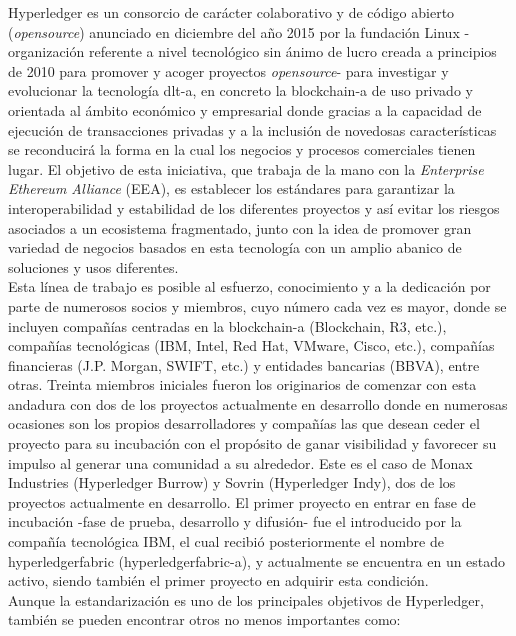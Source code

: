 \documentclass[12pt,a4paper, twoside]{report}
\begin{document}
	Hyperledger es un consorcio de carácter colaborativo y de código abierto (\textit{\gls{opensource}}) anunciado en diciembre del año 2015 por la fundación Linux -organización referente a nivel tecnológico sin ánimo de lucro creada a principios de 2010 para promover y acoger proyectos \textit{\gls{opensource}}- para investigar y evolucionar la tecnología \gls{dlt-a}, en concreto la \gls{blockchain-a} de uso privado y orientada al ámbito económico y empresarial donde gracias a la capacidad de ejecución de transacciones privadas y a la inclusión de novedosas características se reconducirá la forma en la cual los negocios y procesos comerciales tienen lugar. El objetivo de esta iniciativa, que trabaja de la mano con la \textit{Enterprise Ethereum Alliance} (EEA), es establecer los estándares para garantizar la interoperabilidad y estabilidad de los diferentes proyectos y así evitar  los riesgos asociados a un ecosistema fragmentado, junto con la idea de promover gran variedad de negocios basados en esta tecnología con un amplio abanico de soluciones y usos diferentes. \\
	 		
	Esta línea de trabajo es posible al esfuerzo, conocimiento y a la dedicación por parte de numerosos socios y miembros, cuyo número cada vez es mayor, donde se incluyen compañías centradas en la \gls{blockchain-a} (Blockchain, R3, etc.), compañías tecnológicas (IBM, Intel, Red Hat, VMware, Cisco, etc.), compañías financieras (J.P. Morgan, SWIFT, etc.) y entidades bancarias (BBVA), entre otras. Treinta miembros iniciales fueron los originarios de comenzar con esta andadura con dos de los proyectos actualmente en desarrollo donde en numerosas ocasiones son los propios desarrolladores y compañías las que desean ceder el proyecto para su incubación con el propósito de ganar visibilidad y favorecer su impulso al generar una comunidad a su alrededor. Este es el caso de Monax Industries (Hyperledger Burrow) y Sovrin (Hyperledger Indy), dos de los proyectos actualmente en desarrollo. El primer proyecto en entrar en fase de incubación -fase de prueba, desarrollo y difusión- fue el introducido por la compañía tecnológica IBM, el cual recibió posteriormente el nombre de  \gls{hyperledgerfabric} (\gls{hyperledgerfabric-a}), y actualmente se encuentra en un estado activo, siendo también el primer proyecto en adquirir esta condición.	 \\
	
	Aunque la estandarización es uno de los principales objetivos de Hyperledger, también se pueden encontrar otros no menos importantes como:
	
\end{document}
